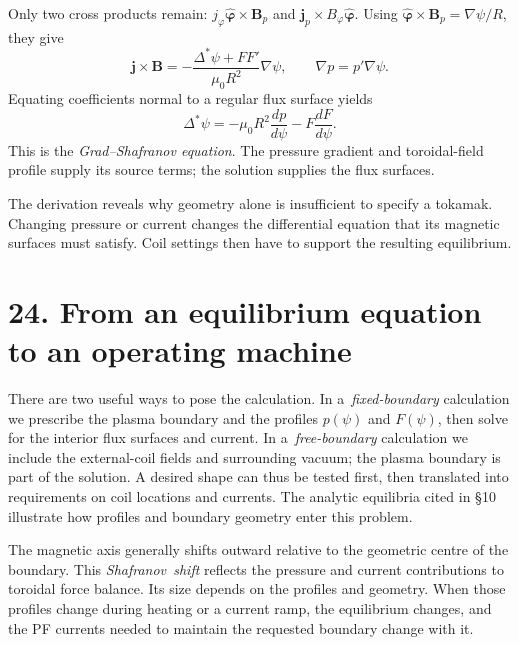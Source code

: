 \documentclass[11pt]{article}
\begin{document}
Only two cross products remain: $j_\varphi\hat{\boldsymbol\varphi}\times\mathbf B_p$
and $\mathbf j_p\times B_\varphi\hat{\boldsymbol\varphi}$. Using
$\hat{\boldsymbol\varphi}\times\mathbf B_p=\nabla\psi/R$, they give
\[
 \mathbf j\times\mathbf B
 =-\frac{\Delta^*\psi+FF'}{\mu_0R^2}\nabla\psi,
 \qquad \nabla p=p'\nabla\psi.
\]
Equating coefficients normal to a regular flux surface yields
\begin{equation}
 \boxed{\Delta^*\psi=-\mu_0R^2\frac{dp}{d\psi}-F\frac{dF}{d\psi}.}
 \label{eq:grad-shafranov}
\end{equation}
This is the \emph{Grad--Shafranov equation}. The pressure gradient and toroidal-field
profile supply its source terms; the solution supplies the flux surfaces.

\noindent\begin{minipage}{\linewidth}
\end{minipage}

The derivation reveals why geometry alone is insufficient to specify a tokamak.
Changing pressure or current changes the differential equation that its magnetic
surfaces must satisfy. Coil settings then have to support the resulting equilibrium.


\section*{24. From an equilibrium equation to an operating machine}
There are two useful ways to pose the calculation. In a~\emph{fixed-boundary} calculation we prescribe the plasma boundary and the profiles $p(\psi)$ and $F(\psi)$,
then solve for the interior flux surfaces and current. In a~\emph{free-boundary} calculation we include the external-coil fields and surrounding vacuum; the plasma
boundary is part of the solution. A desired shape can thus be tested first, then
translated into requirements on coil locations and currents. The analytic equilibria
cited in §10 illustrate how profiles and boundary geometry enter this problem.

The magnetic axis generally shifts outward relative to the geometric centre of the
boundary. This \mbox{\emph{Shafranov shift}} reflects the pressure and current contributions
to toroidal force balance. Its size depends on the profiles and geometry. When those
profiles change during heating or a current ramp, the equilibrium changes, and the
PF currents needed to maintain the requested boundary change with it.
\end{document}
